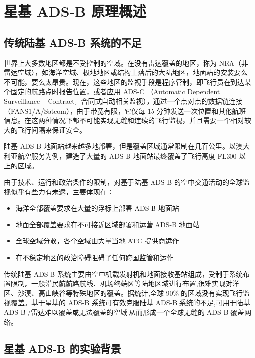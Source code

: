 
\chapter{星基 ADS-B 原理概述}

\section{传统陆基 ADS-B 系统的不足}

世界上大多数地区都是不受控制的空域。在没有雷达覆盖的地区，称为 NRA（非雷达空域），如海洋空域、极地地区或结构上落后的大陆地区，地面站的安装要么不可能，要么太昂贵。现在，这些地区的监视手段是程序管制，即飞行员在到达某个固定的航路点时报告位置，或者应用 ADS-C （Automatic Dependent Surveillance – Contract，合同式自动相关监视），通过一个点对点的数据链连接（FANS1/A/Satcom），由于带宽有限，它仅每 15 分钟发送一次位置和其他航班信息。在这两种情况下都不可能实现无缝和连续的飞行监视，并且需要一个相对较大的飞行间隔来保证安全。

陆基 ADS-B 地面站越来越多地部署，但是覆盖区域通常限制在几百公里。以澳大利亚航空服务为例，建造了大量的 ADS-B 地面站最终覆盖了飞行高度 FL300 以上的区域。

由于技术、运行和政治条件的限制，对基于陆基 ADS-B 的空中交通活动的全球监视似乎有些力有未逮，主要体现在：

\begin{itemize}
    \item 海洋全部覆盖要求在大量的浮标上部署 ADS-B 地面站
    \item 地面全部覆盖要求在不可接近区域部署和运营 ADS-B 地面站
    \item 全球空域分散，各个空域由大量当地 ATC 提供商运作
    \item 在不稳定地区的政治障碍阻碍了任何跨国监管和运作
\end{itemize}

传统陆基 ADS-B 系统主要由空中机载发射机和地面接收基站组成，受制于系统布置限制，一般沿民航航路航线、机场终端区等陆地区域进行布置,很难实现对洋区、沙漠、高山峡谷等特殊地区的覆盖。据统计,全球 90\% 的区域没有实现飞行监视覆盖。基于星基的 ADS-B 系统可有效克服陆基 ADS-B 系统的不足,可用于陆基 ADS-B /雷达难以覆盖或无法覆盖的空域,从而形成一个全球无缝的 ADS-B 覆盖网络。

\section{星基 ADS-B 的实验背景}
\label{sec:space_based_ads-b_experiment_back}

